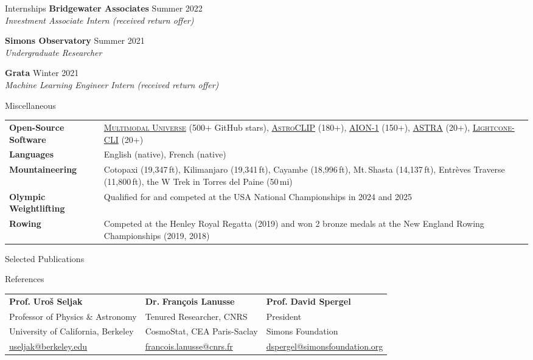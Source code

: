 \documentclass{resume}
\begin{document}
\begin{rSection}{Internships}
{\bf Bridgewater Associates} \hfill {Summer 2022}\\
{\em Investment Associate Intern (received return offer)}
\medskip

{\bf Simons Observatory} \hfill {Summer 2021}\\
{\em Undergraduate Researcher}
\medskip

{\bf Grata} \hfill {Winter 2021}\\
{\em Machine Learning Engineer Intern (received return offer)}
\end{rSection}

\begin{rSection}{Miscellaneous}
\begin{tabular}{ @{} >{\bfseries}l @{\hspace{6ex}} p{} }
Open-Source Software & \href{https://github.com/MultimodalUniverse/MultimodalUniverse}{\textsc{Multimodal Universe}} (500+ GitHub stars), \href{https://github.com/PolymathicAI/AstroCLIP}{\textsc{AstroCLIP}} (180+), \href{https://github.com/PolymathicAI/AION}{\textsc{AION-1}} (150+), \href{https://github.com/LightconeResearch/astra-spec}{\textsc{ASTRA}} (20+), \href{https://github.com/LightconeResearch/lightcone-cli}{\textsc{Lightcone-CLI}} (20+)\smallskip\\
Languages & English (native), French (native)\smallskip\\
Mountaineering & Cotopaxi (19,347\,ft), Kilimanjaro (19,341\,ft), Cayambe (18,996\,ft), Mt.\,Shasta (14,137\,ft), Entr\`{e}ves Traverse (11,800\,ft), the W Trek in Torres del Paine (50\,mi)\smallskip\\
Olympic Weightlifting & Qualified for and competed at the USA National Championships in 2024 and 2025\smallskip\\
Rowing & Competed at the Henley Royal Regatta (2019) and won 2 bronze medals at the New England Rowing Championships (2019, 2018)
\end{tabular}
\end{rSection}

\begin{rSection}{Selected Publications}



\end{rSection}

\begin{rSection}{References}
\begin{tabular}{l @{\hspace{6ex}} l @{\hspace{6ex}} l}
\textbf{Prof.\,\,Uro\v{s} Seljak} & \textbf{Dr.\,\,Fran\c{c}ois Lanusse} & \textbf{Prof.\,\,David Spergel}\\
Professor of Physics \& Astronomy & Tenured Researcher, CNRS & President\\
University of California, Berkeley & CosmoStat, CEA Paris-Saclay & Simons Foundation\\
\href{mailto:useljak@berkeley.edu}{useljak@berkeley.edu} & \href{mailto:francois.lanusse@cnrs.fr}{francois.lanusse@cnrs.fr} & \href{mailto:dspergel@simonsfoundation.org}{dspergel@simonsfoundation.org}
\end{tabular}
\end{rSection}
\end{document}
